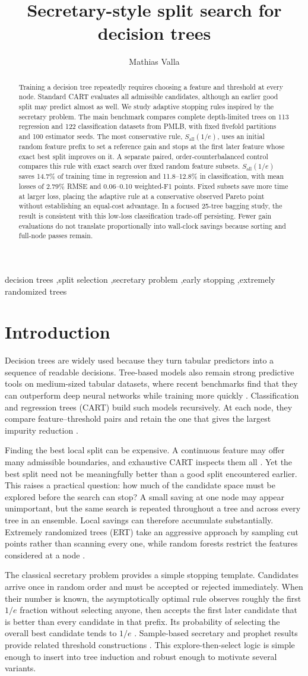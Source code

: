 \documentclass[final,5p,times,twocolumn]{elsarticle}
\newcommand{\mainabstracttext}{Training a decision tree repeatedly requires choosing a feature and threshold at every node. Standard CART evaluates all admissible candidates, although an earlier good split may predict almost as well. We study adaptive stopping rules inspired by the secretary problem. The main benchmark compares complete depth-limited trees on 113 regression and 122 classification datasets from PMLB, with fixed fivefold partitions and 100 estimator seeds. The most conservative rule, \(S_{\mathrm{all}}(1/e)\), uses an initial random feature prefix to set a reference gain and stops at the first later feature whose exact best split improves on it. A separate paired, order-counterbalanced control compares this rule with exact search over fixed random feature subsets. \(S_{\mathrm{all}}(1/e)\) saves 14.7\% of training time in regression and 11.8--12.8\% in classification, with mean losses of 2.79\% RMSE and 0.06--0.10 weighted-F1 points. Fixed subsets save more time at larger loss, placing the adaptive rule at a conservative observed Pareto point without establishing an equal-cost advantage. In a focused 25-tree bagging study, the result is consistent with this low-loss classification trade-off persisting. Fewer gain evaluations do not translate proportionally into wall-clock savings because sorting and full-node passes remain.}
\begin{document}
\begin{frontmatter}
\title{Secretary-style split search for decision trees}
\author[inst1]{Mathias Valla}
\address[inst1]{Chaire DIALog, Institut Louis Bachelier, 28 Place de la Bourse, 75002 Paris, France}

\begin{abstract}
\mainabstracttext
\end{abstract}

\begin{keyword}
decision trees \sep split selection \sep secretary problem \sep early stopping \sep extremely randomized trees
\end{keyword}
\end{frontmatter}

\section{Introduction}
\label{sec:introduction}

Decision trees are widely used because they turn tabular predictors into a sequence of readable decisions. Tree-based models also remain strong predictive tools on medium-sized tabular datasets, where recent benchmarks find that they can outperform deep neural networks while training more quickly \cite{grinsztajn2022tabular}. Classification and regression trees (CART) build such models recursively. At each node, they compare feature--threshold pairs and retain the one that gives the largest impurity reduction \cite{breiman1984cart,quinlan1986induction}.

Finding the best local split can be expensive. A continuous feature may offer many admissible boundaries, and exhaustive CART inspects them all \cite{fayyad1992continuous}. Yet the best split need not be meaningfully better than a good split encountered earlier. This raises a practical question: how much of the candidate space must be explored before the search can stop? A small saving at one node may appear unimportant, but the same search is repeated throughout a tree and across every tree in an ensemble. Local savings can therefore accumulate substantially. Extremely randomized trees (ERT) take an aggressive approach by sampling cut points rather than scanning every one, while random forests restrict the features considered at a node \cite{breiman2001rf,geurts2006extra}.

The classical secretary problem provides a simple stopping template. Candidates arrive once in random order and must be accepted or rejected immediately. When their number is known, the asymptotically optimal rule observes roughly the first \(1/e\) fraction without selecting anyone, then accepts the first later candidate that is better than every candidate in that prefix. Its probability of selecting the overall best candidate tends to \(1/e\) \cite{gilbertmosteller1966,ferguson1989secretary}. Sample-based secretary and prophet results provide related threshold constructions \cite{nuti2023single,rubinstein2020samples}. This explore-then-select logic is simple enough to insert into tree induction and robust enough to motivate several variants.
\end{document}
